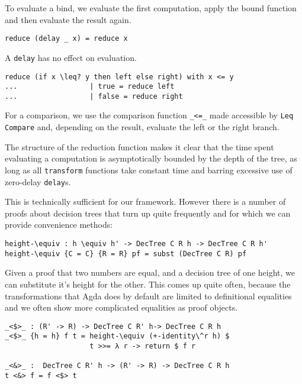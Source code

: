 To evaluate a bind, we evaluate the first computation, apply the bound function and then evaluate the result again.

\begin{lstlisting}[caption={Evaluating the Monad},label={lst:dectree-eval:4},emph={reduce,DecTree,delay}]
reduce (delay _ x) = reduce x
\end{lstlisting}

A \texttt{delay} has no effect on evaluation.

\begin{lstlisting}[caption={Evaluating the Monad},label={lst:dectree-eval:5},emph={reduce,DecTree,if,then,else}]
reduce (if x \leq? y then left else right) with x <= y
...                 | true = reduce left
...                 | false = reduce right
\end{lstlisting}

For a comparison, we use the comparison function \texttt{\_<=\_} made accessible by \texttt{Leq Compare} and, depending on the result, evaluate the left or the right branch.

The structure of the reduction function makes it clear that the time spent evaluating a computation is asymptotically bounded by the depth of the tree, as long as all \texttt{transform} functions take constant time and barring excessive use of zero-delay \texttt{delay}s.


This is technically sufficient for our framework. However there is a number of proofs about decision trees that turn up quite frequently and for which we can provide convenience methods:

\begin{lstlisting}[caption={Height Substitution},label={lst:dectree:height-equiv},emph={height,DecTree}]
height-\equiv : h \equiv h' -> DecTree C R h -> DecTree C R h'
height-\equiv {C = C} {R = R} pf = subst (DecTree C R) pf
\end{lstlisting}

Given a proof that two numbers are equal, and a decision tree of one height, we can substitute it's height for the other. This comes up quite often, because the transformations that Agda does by default are limited to definitional equalities and we often show more complicated equalities as proof objects.

\begin{lstlisting}[caption={Functor Implementation for DecTree},label={lst:dectree:functor},emph={DecTree,return,height}]
_<$>_ : (R' -> R) -> DecTree C R' h-> DecTree C R h
_<$>_ {h = h} f t = height-\equiv (+-identity\^r h) $
                    t >>= λ r -> return $ f r

_<&>_ :  DecTree C R' h -> (R' -> R) -> DecTree C R h
t <&> f = f <$> t
\end{lstlisting}

